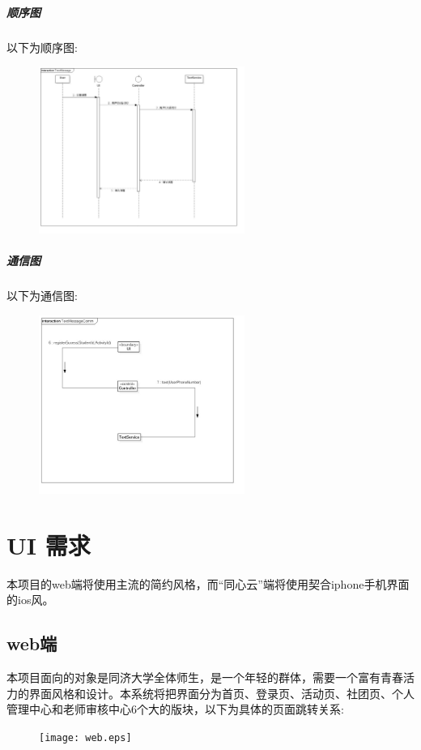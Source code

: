 \documentclass[UTF8]{ctexart}
\begin{document}
\subparagraph*{顺序图}
以下为顺序图:\\
\begin{figure}[H]
\centering
\includegraphics[width = 0.6\textwidth]{TextMessageSeq.jpg}
\end{figure}

\subparagraph*{通信图}
以下为通信图:\\
\begin{figure}[H]
\centering
\includegraphics[width = 0.6\textwidth]{TextMessageComm.jpg}
\end{figure}

\section{UI 需求}
本项目的web端将使用主流的简约风格，而“同心云”端将使用契合iphone手机界面的ios风。
\subsection{web端}
本项目面向的对象是同济大学全体师生，是一个年轻的群体，需要一个富有青春活力的界面风格和设计。本系统将把界面分为首页、登录页、活动页、社团页、个人管理中心和老师审核中心6个大的版块，以下为具体的页面跳转关系:
\newline
\begin{figure}[H]
\centering
\texttt{[image: web.eps]}
\end{figure}
\end{document}
